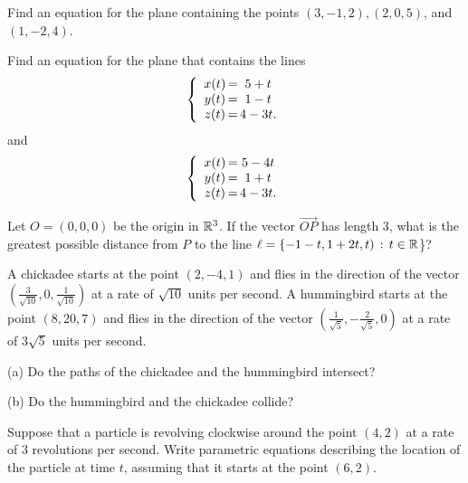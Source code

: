 \documentclass{watsonbook}
\begin{document}

\begin{aexercise}
  Find an equation for the plane containing the points $(3, -1, 2),
  (2, 0, 5)$, and $(1, -2, 4)$.
\end{aexercise}

\begin{aexercise}
  Find an equation for the plane that contains the lines
\[
\left\{
\begin{array}{c@{\,}c@{\,}c}
  x(t)&=&5+t \\
  y(t)&=&1-t \\
  z(t)&=&4-3t. 
\end{array}
\right.
\]
and
\[
\left\{
\begin{array}{c@{\,}c@{\,}c}
  x(t)&=&5-4t \\
  y(t)&=&1+t \\
  z(t)&=&4-3t. 
\end{array}
\right.
\]
\end{aexercise}

\begin{aexercise}
  Let $O=(0,0,0)$ be the origin in $\mathbb{R}^3$. If the vector
  $\overrightarrow{OP}$ has length 3, what is the greatest possible
  distance from $P$ to the line
  $\ell = \{-1-t,1+2t,t) \,:\, t\in \mathbb{R}$\}?
\end{aexercise}


\begin{aexercise}
A chickadee starts at the point $(2,-4,1)$ and flies in the direction of the vector $\left(\frac{3}{\sqrt{10}},0,\frac{1}{\sqrt{10}}\right)$ at a rate of $\sqrt{10}$ units per second. A hummingbird starts at the point $(8,20,7)$ and flies in the direction of the vector $\left(\frac{1}{\sqrt{5}},-\frac{2}{\sqrt{5}},0\right)$ at a rate of $3\sqrt{5}$ units per second.

(a) Do the paths of the chickadee and the hummingbird intersect? 

(b) Do the hummingbird and the chickadee collide?
\end{aexercise}

\begin{aexercise}
  Suppose that a particle is revolving clockwise around the point
  $(4,2)$ at a rate of 3 revolutions per second. Write parametric
  equations describing the location of the particle at time $t$,
  assuming that it starts at the point $(6,2)$.
\end{aexercise}
\end{document}
